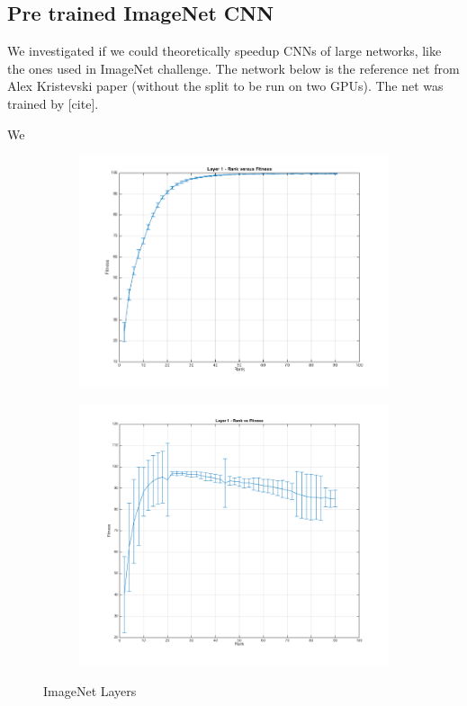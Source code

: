 
\subsection{Pre trained ImageNet CNN}
We investigated if we could theoretically speedup CNNs of large networks, like the ones used in ImageNet challenge. The network below is the reference net from Alex Kristevski paper (without the split to be run on two GPUs). The net was trained by [cite].

We  

\begin{figure}[h]
  \centering
  \begin{subfigure}[b]{0.40\textwidth}
   \includegraphics[width=\textwidth]{images/Layer1ImageNet.png}
    \caption{}
  \end{subfigure}
  \begin{subfigure}[b]{0.40\textwidth}
    \includegraphics[width=\textwidth]{images/Layer2ImageNet.png}
    \caption{}
  \end{subfigure}
  \caption{ImageNet Layers}
  \label{fig:user_stribution}
\end{figure}

